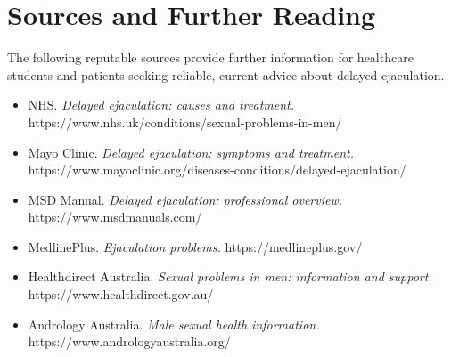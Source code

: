 \section*{Sources and Further Reading}
The following reputable sources provide further information for healthcare students and patients seeking reliable, current advice about delayed ejaculation.

\begin{itemize}
    \item NHS. \textit{Delayed ejaculation: causes and treatment.} https://www.nhs.uk/conditions/sexual-problems-in-men/
    \item Mayo Clinic. \textit{Delayed ejaculation: symptoms and treatment.} https://www.mayoclinic.org/diseases-conditions/delayed-ejaculation/
    \item MSD Manual. \textit{Delayed ejaculation: professional overview.} https://www.msdmanuals.com/
    \item MedlinePlus. \textit{Ejaculation problems.} https://medlineplus.gov/
    \item Healthdirect Australia. \textit{Sexual problems in men: information and support.} https://www.healthdirect.gov.au/
    \item Andrology Australia. \textit{Male sexual health information.} https://www.andrologyaustralia.org/
\end{itemize}
